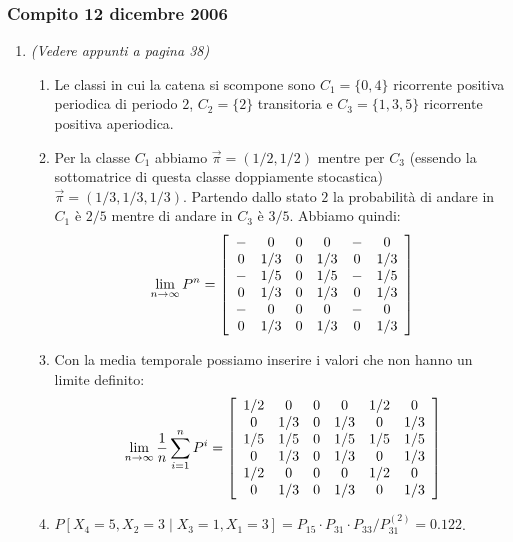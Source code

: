 \documentclass{article}
\begin{document}
\subsubsection{Compito 12 dicembre 2006}
\begin{enumerate}

    \item\emph{(Vedere appunti a pagina 38)}
    \begin{enumerate}[label=\alph*)]
        \item Le classi in cui la catena si scompone sono $C_1 = \{0,4\}$ ricorrente positiva periodica di periodo $2$, $C_2 = \{2\}$ transitoria e $C_3=\{1,3,5\}$ ricorrente positiva aperiodica.
        \item Per la classe $C_1$ abbiamo $\vec{\pi} = (1/2,1/2)$ mentre per $C_3$ (essendo la sottomatrice di questa classe doppiamente stocastica) $\vec{\pi} = (1/3,1/3,1/3)$. Partendo dallo stato $2$ la probabilità di andare in $C_1$ è $2/5$ mentre di andare in $C_3$ è $3/5$. Abbiamo quindi:
        \begin{align*}
        \lim_{n\to\infty} P^n = \left[\begin{array}{c c c c c c}
        - & 0& 0& 0& - & 0\\
        0 & 1/3& 0& 1/3& 0 & 1/3\\
        - & 1/5& 0& 1/5& - & 1/5\\
        0 & 1/3& 0& 1/3& 0 & 1/3\\
        - & 0& 0& 0& - & 0\\
        0 & 1/3& 0& 1/3& 0 & 1/3\\
        \end{array}\right]
        \end{align*}
        \item Con la media temporale possiamo inserire i valori che non hanno un limite definito:
        \begin{align*}
        \lim_{n\to\infty}\frac{1}{n}\sum_{i=1}^n P^i = \left[\begin{array}{c c c c c c}
        1/2 & 0& 0& 0& 1/2 & 0\\
        0 & 1/3& 0& 1/3& 0 & 1/3\\
        1/5 & 1/5& 0& 1/5& 1/5 & 1/5\\
        0 & 1/3& 0& 1/3& 0 & 1/3\\
        1/2 & 0& 0& 0& 1/2 & 0\\
        0 & 1/3& 0& 1/3& 0 & 1/3\\
        \end{array}\right]
        \end{align*}
        \item $P[X_4 = 5,X_2 = 3\mid X_3 = 1,X_1=3] = P_{15}\cdot P_{31}\cdot P_{33}/P_{31}^{(2)} = 0.122$.
    \end{enumerate}
    

\end{enumerate}
\end{document}
